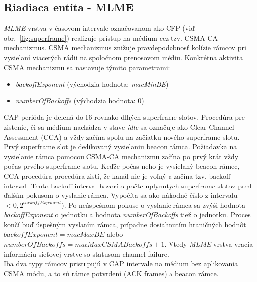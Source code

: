 \subsection{Riadiaca entita - MLME}
\indent\indent \textit{MLME} vrstva v časovom intervale označovanom ako CFP (viď obr.~\ref{fig:superframe}) realizuje prístup na médium cez tzv. CSMA-CA mechanizmus. CSMA mechanizmus znižuje pravdepodobnosť kolízie rámcov pri vysielaní viacerých rádii na spoločnom prenosovom médiu. Konkrétna aktivita CSMA mechanizmu sa nastavuje týmito parametrami:
\begin{itemize}
\item \textit{backoffExponent} (východzia hodnota: \textit{macMinBE})
\item \textit{numberOfBackoffs} (východzia hodnota: $0$)
\end{itemize}
\indent\indent CAP perióda je delená do 16 rovnako dlhých superframe slotov. Procedúra pre zistenie, či sa médium nachádza v stave \textit{idle} sa označuje ako Clear Channel Assessment (CCA) a vždy začína spolu na začiatku nového superframe slotu. Prvý superframe slot je dedikovaný vysielaniu beacon rámca. Požiadavka na vysielanie rámca pomocou CSMA-CA mechanizmu začína po prvý krát vždy počas prvého superframe slotu. Keďže počas neho je vysielaný beacon rámec, CCA procedúra procedúra zistí, že kanál nie je voľný a začína tzv. backoff interval. Tento backoff interval hovorí o počte uplynutých superframe slotov pred ďalším pokusom o vyslanie rámca. Vypočíta sa ako náhodné číslo z intervalu $<0, 2^{backoffExponent})$. Po neúspešnom pokuse o vyslanie rámca sa zvýši hodnota \textit{backoffExponent} o jednotku a hodnota \textit{numberOfBackoffs} tiež o jednotku. Proces končí buď úspešným vyslaním rámca, prípadne dosiahnutím hraničných hodnôt $backoffExponent = macMaxBE$ alebo $numberOfBackoffs = macMaxCSMABackoffs + 1$. Vtedy \textit{MLME} vrstva vracia informáciu sieťovej vrstve so statusom channel failure.\\
\indent\indent Iba dva typy rámcov pristupujú v CAP intervale na médium bez aplikovania CSMA módu, a to sú rámce potvrdení (ACK frames) a beacon rámce.\\

